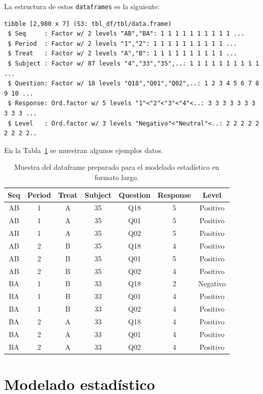 \documentclass[
  12pt,
  a4paper,
  extrafontsizes,
  onecolumn,
  openright,
  table]{memoir}
\begin{document}
La estructura de estos \texttt{dataframes} es la siguiente:

\begin{verbatim}
tibble [2,980 x 7] (S3: tbl_df/tbl/data.frame)
 $ Seq     : Factor w/ 2 levels "AB","BA": 1 1 1 1 1 1 1 1 1 1 ...
 $ Period  : Factor w/ 2 levels "1","2": 1 1 1 1 1 1 1 1 1 1 ...
 $ Treat   : Factor w/ 2 levels "A","B": 1 1 1 1 1 1 1 1 1 1 ...
 $ Subject : Factor w/ 87 levels "4","33","35",..: 1 1 1 1 1 1 1 1 1 1 ...
 $ Question: Factor w/ 18 levels "Q18","Q01","Q02",..: 1 2 3 4 5 6 7 8 9 10 ...
 $ Response: Ord.factor w/ 5 levels "1"<"2"<"3"<"4"<..: 3 3 3 3 3 3 3 3 3 3 ...
 $ Level   : Ord.factor w/ 3 levels "Negativo"<"Neutral"<..: 2 2 2 2 2 2 2 2 2..
\end{verbatim}

En la Tabla~\ref{tbl-df_clean} se muestran algunos ejemplos datos.

\hypertarget{tbl-df_clean}{}
\begin{longtable}{ccccccc}
\caption{\label{tbl-df_clean}Muestra del dataframe preparado para el modelado estadístico en formato
largo. }\tabularnewline

\toprule
Seq & Period & Treat & Subject & Question & Response & Level \\ 
\midrule
AB & 1 & A & 35 & Q18 & 5 & Positivo \\ 
AB & 1 & A & 35 & Q01 & 5 & Positivo \\ 
AB & 1 & A & 35 & Q02 & 5 & Positivo \\ 
AB & 2 & B & 35 & Q18 & 4 & Positivo \\ 
AB & 2 & B & 35 & Q01 & 5 & Positivo \\ 
AB & 2 & B & 35 & Q02 & 4 & Positivo \\ 
BA & 1 & B & 33 & Q18 & 2 & Negativo \\ 
BA & 1 & B & 33 & Q01 & 4 & Positivo \\ 
BA & 1 & B & 33 & Q02 & 4 & Positivo \\ 
BA & 2 & A & 33 & Q18 & 4 & Positivo \\ 
BA & 2 & A & 33 & Q01 & 4 & Positivo \\ 
BA & 2 & A & 33 & Q02 & 4 & Positivo \\ 
\bottomrule
\end{longtable}


\hypertarget{sec-modelado}{%
\chapter{Modelado estadístico}\label{sec-modelado}}
\end{document}
